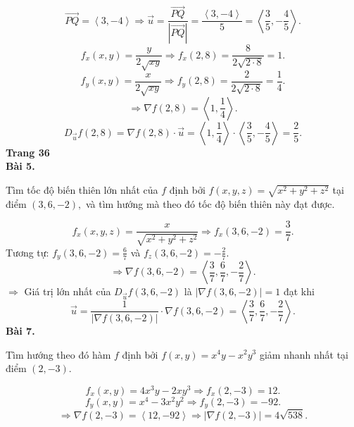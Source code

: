 \documentclass[12pt,a4paper]{article}
\begin{document}
\[\overrightarrow {PQ}  = \left\langle {3, - 4} \right\rangle  \Rightarrow \overrightarrow u  = \frac{{\overrightarrow {PQ} }}{{\left| {\overrightarrow {PQ} } \right|}} = \frac{{\left\langle {3, - 4} \right\rangle }}{5} = \left\langle {\frac{3}{5}, - \frac{4}{5}} \right\rangle .\]
\[{f_x}\left( {x,y} \right) = \frac{y}{{2\sqrt {xy} }} \Rightarrow {f_x}\left( {2,8} \right) = \frac{8}{{2\sqrt {2 \cdot 8} }} = 1.\]
\[{f_y}\left( {x,y} \right) = \frac{x}{{2\sqrt {xy} }} \Rightarrow {f_y}\left( {2,8} \right) = \frac{2}{{2\sqrt {2 \cdot 8} }} = \frac{1}{4}.\]
\[ \Rightarrow \nabla f\left( {2,8} \right) = \left\langle {1,\frac{1}{4}} \right\rangle .\]
\[{D_{\overrightarrow u }}f\left( {2,8} \right) = \nabla f\left( {2,8} \right) \cdot \overrightarrow u  = \left\langle {1,\frac{1}{4}} \right\rangle  \cdot \left\langle {\frac{3}{5}, - \frac{4}{5}} \right\rangle  = \frac{2}{5}.\]
\textbf{Trang 36}\\
\textbf{Bài 5.}
\begin{mybox}
Tìm tốc độ biến thiên lớn nhất của \(f\) định bởi \(f\left( {x,y,z} \right) = \sqrt {{x^2} + {y^2} + {z^2}} \) tại điểm \(\left( {3,6, - 2} \right),\) và tìm hướng mà theo đó tốc độ biến thiên này đạt được.
\end{mybox}
\[{f_x}\left( {x,y,z} \right) = \frac{x}{{\sqrt {{x^2} + {y^2} + {z^2}} }} \Rightarrow {f_x}\left( {3,6, - 2} \right) = \frac{3}{7}.\]
Tương tự: \({f_y}\left( {3,6, - 2} \right) = \frac{6}{7}\) và \({f_z}\left( {3,6, - 2} \right) =  - \frac{2}{7}.\)
\[ \Rightarrow \nabla f\left( {3,6, - 2} \right) = \left\langle {\frac{3}{7},\frac{6}{7}, - \frac{2}{7}} \right\rangle .\]
\( \Rightarrow \) Giá trị lớn nhất của \({D_{\overrightarrow u }}f\left( {3,6, - 2} \right)\) là \(\left| {\nabla f\left( {3,6, - 2} \right)} \right| = 1\) đạt khi
\[\overrightarrow u  = \frac{1}{{\left| {\nabla f\left( {3,6, - 2} \right)} \right|}} \cdot \nabla f\left( {3,6, - 2} \right) = \left\langle {\frac{3}{7},\frac{6}{7}, - \frac{2}{7}} \right\rangle .\]
\textbf{Bài 7.}
\begin{mybox}
Tìm hướng theo đó hàm \(f\) định bởi \(f\left( {x,y} \right) = {x^4}y - {x^2}{y^3}\) giảm nhanh nhất tại điểm \(\left( {2, - 3} \right).\)
\end{mybox}
\[{f_x}\left( {x,y} \right) = 4{x^3}y - 2x{y^3} \Rightarrow {f_x}\left( {2, - 3} \right) = 12.\]
\[{f_y}\left( {x,y} \right) = {x^4} - 3{x^2}{y^2} \Rightarrow {f_y}\left( {2, - 3} \right) =  - 92.\]
\[ \Rightarrow \nabla f\left( {2, - 3} \right) = \left\langle {12, - 92} \right\rangle  \Rightarrow \left| {\nabla f\left( {2, - 3} \right)} \right| = 4\sqrt {538} .\]
\end{document}
